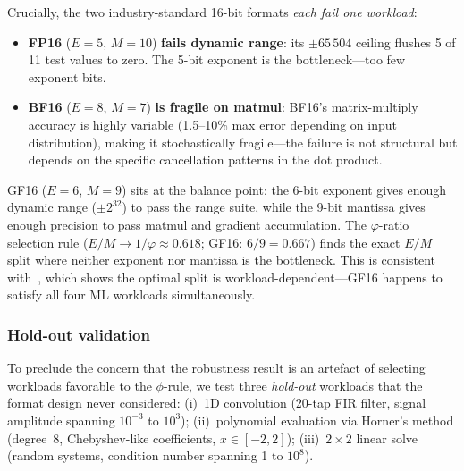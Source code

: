 \documentclass[11pt]{article}
\begin{document}
Crucially, the two industry-standard 16-bit formats \emph{each fail one
workload}:

\begin{itemize}[leftmargin=*]
\item \textbf{FP16} ($E{=}5$, $M{=}10$) \textbf{fails dynamic range}: its
  $\pm 65\,504$ ceiling flushes 5 of 11 test values to zero. The 5-bit exponent
  is the bottleneck---too few exponent bits.
\item \textbf{BF16} ($E{=}8$, $M{=}7$) \textbf{is fragile on matmul}: BF16's
  matrix-multiply accuracy is highly variable (1.5--10\% max error depending on
  input distribution), making it stochastically fragile---the failure is not
  structural but depends on the specific cancellation patterns in the dot
  product.
\end{itemize}

GF16 ($E{=}6$, $M{=}9$) sits at the balance point: the 6-bit exponent gives
enough dynamic range ($\pm 2^{32}$) to pass the range suite, while the 9-bit
mantissa gives enough precision to pass matmul and gradient accumulation. The
$\varphi$-ratio selection rule ($E/M \to 1/\varphi \approx 0.618$; GF16:
$6/9 = 0.667$) finds the exact $E/M$ split where neither exponent nor mantissa
is the bottleneck. This is consistent with~\cite{kuzmin2022fp8quant}, which
shows the optimal split is workload-dependent---GF16 happens to satisfy all
four ML workloads simultaneously.

\subsubsection{Hold-out validation}

To preclude the concern that the robustness result is an artefact of
selecting workloads favorable to the $\phi$-rule, we test three
\emph{hold-out} workloads that the format design never considered:
(i)~1D convolution (20-tap FIR filter, signal amplitude spanning
$10^{-3}$ to $10^3$);
(ii)~polynomial evaluation via Horner's method (degree~8,
Chebyshev-like coefficients, $x \in [-2, 2]$);
(iii)~$2 \times 2$ linear solve (random systems, condition number
spanning 1 to $10^8$).
\end{document}
